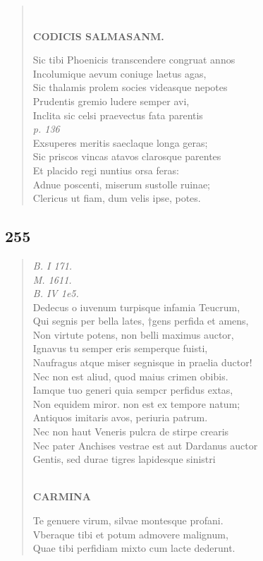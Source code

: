 \documentclass[11pt, a4paper]{report}
\begin{document}
\begin{verse}
        ﻿\pagebreak 
    \begin{center} \textbf{CODICIS SALMASANM.} \end{center}Sic tibi Phoenicis transcendere congruat annos \\ Incolumique aevum coniuge laetus agas, \\ Sic thalamis prolem socies videasque nepotes \\ Prudentis gremio ludere semper avi, \\ Inclita sic celsi praevectus fata parentis \\ \textit{p. 136} \\ Exsuperes meritis saeclaque longa geras; \\ Sic priscos vincas atavos clarosque parentes \\ Et placido regi nuntius orsa feras: \\ Adnue poscenti, miserum sustolle ruinae; \\ Clericus ut fiam, dum velis ipse, potes. \\ 
      \end{verse}
  
            \subsection*{255}
      \begin{verse}
      \textit{B. I 171.} \\ \textit{M. 1611.} \\ \textit{B. IV 1e5.} \\ Dedecus o iuvenum turpisque infamia Teucrum, \\ Qui segnis per bella lates, †gens perfida et amens, \\ Non virtute potens, non belli maximus auctor, \\ Ignavus tu semper eris semperque fuisti, \\ Naufragus atque miser segnisque in praelia ductor! \\ Nec non est aliud, quod maius crimen obibis. \\ Iamque tuo generi quia sempcr perfidus extas, \\ Non equidem miror. non est ex tempore natum; \\ Antiquos imitaris avos, periuria patrum. \\ Nec non haut Veneris pulcra de stirpe crearis \\ Nec pater Anchises vestrae  \lbrack est \rbrack  aut Dardanus auctor \\ Gentis, sed durae tigres lapidesque sinistri \\ 
        ﻿\pagebreak 
    \begin{center} \textbf{CARMINA} \end{center}Te genuere virum, silvae montesque profani. \\ Vberaque tibi et potum admovere malignum, \\ Quae tibi perfidiam mixto cum lacte dederunt. \\ 
      \end{verse}
  
\end{document}
